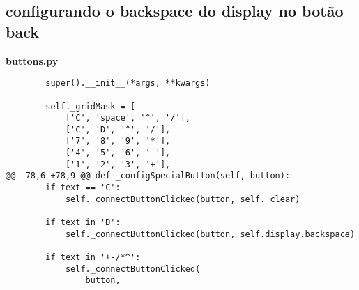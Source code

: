 \documentclass[12pt,a4paper]{article}
\begin{document}
\subsection{configurando o backspace do display no botão back}
    \textbf{buttons.py}
    \begin{lstlisting}
        super().__init__(*args, **kwargs)

        self._gridMask = [
            ['C', 'space', '^', '/'],
            ['C', 'D', '^', '/'],
            ['7', '8', '9', '*'],
            ['4', '5', '6', '-'],
            ['1', '2', '3', '+'],
@@ -78,6 +78,9 @@ def _configSpecialButton(self, button):
        if text == 'C':
            self._connectButtonClicked(button, self._clear)

        if text in 'D':
            self._connectButtonClicked(button, self.display.backspace)

        if text in '+-/*^':
            self._connectButtonClicked(
                button,
    \end{lstlisting}

    
\end{document}
